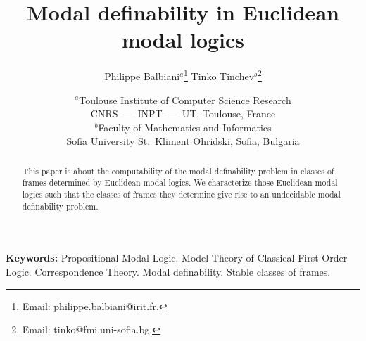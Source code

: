 \documentclass[draft]{article}
\begin{document}
%
%
%
%
\title{Modal definability in Euclidean modal logics}
%
%
%
%
\author{Philippe Balbiani$^{a}$\footnote{Email: philippe.balbiani@irit.fr.}
%
%
\hspace{0.24cm}
%
%
Tinko Tinchev$^{b}$\footnote{Email: tinko@fmi.uni-sofia.bg.}}
%
%
%
%
\date{$^{a}$Toulouse Institute of Computer Science Research
%
%
\\
%
%
CNRS~---~INPT~---~UT, Toulouse, France
%
%
\\
%
%
$^{b}$Faculty of Mathematics and Informatics
%
%
\\
%
%
Sofia University St.~Kliment Ohridski, Sofia, Bulgaria}
%
%
%
%
\maketitle
%
%
%
%
\begin{abstract}
%
%
This paper is about the computability of the modal definability problem in classes of frames determined by Euclidean modal logics.
We characterize those Euclidean modal logics such that the classes of frames they determine give rise to an undecidable modal definability problem.
%
%
\end{abstract}
%
%
%
%
{\bf Keywords:}
%
%
Propositional Modal Logic.
Model Theory of Classical First-Order Logic.
Correspondence Theory.
Modal definability.
Stable classes of frames.
%
%
%
%
\end{document}
